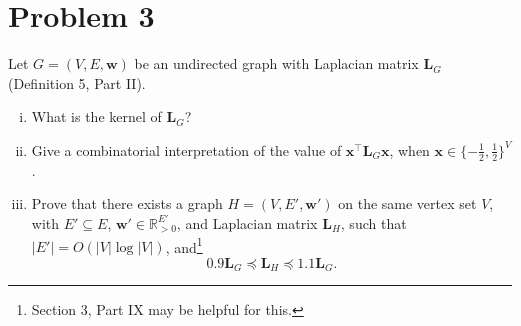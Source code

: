\section*{Problem 3}

Let $G = (V, E, \mathbf{w})$ be an undirected graph with Laplacian matrix $\mathbf{L}_G$ (Definition 5, Part II).

\begin{enumerate}[(i)]
    \item What is the kernel of $\mathbf{L}_G$?
    \item Give a combinatorial interpretation of the value of $\mathbf{x}^\top \mathbf{L}_G \mathbf{x}$, when $\mathbf{x} \in \{-\frac{1}{2}, \frac{1}{2}\}^V$.
    \item Prove that there exists a graph $H = (V, E', \mathbf{w}')$ on the same vertex set $V$, with $E' \subseteq E$, $\mathbf{w}' \in \mathbb{R}^{E'}_{>0}$, and Laplacian matrix $\mathbf{L}_H$, such that $|E'| = O(|V| \log |V|)$, and\footnote{Section 3, Part IX may be helpful for this.}
    \[
        0.9 \mathbf{L}_G \preceq \mathbf{L}_H \preceq 1.1 \mathbf{L}_G.
    \]
\end{enumerate}

